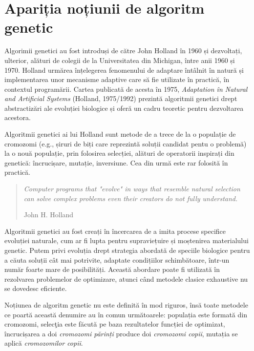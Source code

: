 \section{Apariția noțiunii de algoritm genetic} 
 
Algorimii genetici\cite{article_by_melanie_mitchell} au fost introduși de către John Holland în 1960 și dezvoltați, ulterior, alături de colegii de la Universitatea din Michigan, între anii 1960 și 1970. Holland urmărea înțelegerea fenomenului de adaptare întâlnit în natură și implementarea unor mecanisme adaptive care să fie utilizate în practică, în contextul programării. Cartea publicată de acesta în 1975, \textit{Adaptation în Natural and Artificial Systems} (Holland, 1975/1992) prezintă algoritmii genetici drept abstractizări ale evoluției biologice și oferă un cadru teoretic pentru dezvoltarea acestora.

Algoritmii genetici ai lui Holland sunt metode de a trece de la o populație de cromozomi (e.g., șiruri de biți care reprezintă soluții candidat pentu o problemă) la o nouă populație, prin folosirea selecției, alături de operatorii inspirați din genetică: încrucișare, mutație, inversiune. Cea din urmă este rar folosită în practică.

\begin{quote} 
	\textit{Computer programs that "evolve" in ways that resemble natural selection can solve complex problems even their creators do not fully understand.}
	\begin{flushright}
		John H. Holland 
	\end{flushright}
\end{quote}

\clearpage

Algoritmii genetici au fost creați în încercarea de a imita procese specifice evoluției naturale, cum ar fi lupta pentru supraviețuire și moștenirea materialului genetic. Putem privi evoluția drept strategia abordată de speciile biologice pentru a căuta soluții cât mai potrivite, adaptate condițiilor schimbătoare, într-un număr foarte mare de posibilități. Această abordare poate fi utilizată în rezolvarea problemelor de optimizare, atunci când metodele clasice exhaustive nu se dovedesc eficiente. 
 
Noțiunea de algoritm genetic nu este definită în mod riguros\cite{introduction_by_melanie_mitchell}, însă toate metodele ce poartă această denumire au în comun următoarele: populația este formată din cromozomi, selecţia este făcută pe baza rezultatelor funcției de optimizat, încrucișarea a doi \textit{cromozomi părinți} produce doi \textit{cromozomi copii}, mutația se aplică \textit{cromozomilor copii}. 

